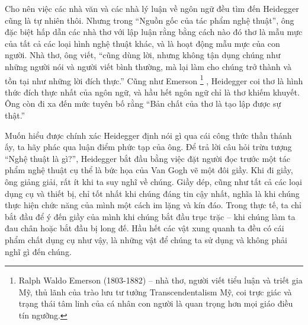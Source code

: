 \documentclass[../main.tex]{subfiles}
\begin{document}
\begin{multicols}{2}
Cho nên việc các nhà văn và các nhà lý luận về ngôn ngữ đều tìm đến Heidegger cũng là tự nhiên thôi. Nhưng trong “Nguồn gốc của tác phẩm nghệ thuật”, ông đặc biệt hấp dẫn các nhà thơ với lập luận rằng bằng cách nào đó thơ là mẫu mực của tất cả các loại hình nghệ thuật khác, và là hoạt động mẫu mực của con người. Nhà thơ, ông viết, “cũng dùng lời, nhưng không tận dụng chúng như những người nói và người viết bình thường, mà lại làm cho chúng trở thành và tồn tại như những lời đích thực.” Cũng như Emerson \footnote{
Ralph Waldo Emerson (1803-1882) – nhà thơ, người viết tiểu luận và triết gia Mỹ, thủ lãnh của trào lưu tư tưởng Transcendentalism Mỹ, coi trực giác và trạng thái tâm linh của cá nhân con người là quan trọng hơn mọi giáo điều tín ngưỡng.} , Heidegger coi thơ là hình thức đích thực nhất của ngôn ngữ, và hầu hết ngôn ngữ chỉ là thơ khiếm khuyết. Ông còn đi xa đến mức tuyên bố rằng “Bản chất của thơ là tạo lập được sự thật.” 

Muốn hiểu được chính xác Heidegger định nói gì qua cái công thức thần thánh ấy, ta hãy phác qua luận điểm phức tạp của ông. Để trả lời câu hỏi trừu tượng “Nghệ thuật là gì?”, Heidegger bắt đầu bằng việc đặt người đọc trước một tác phẩm nghệ thuật cụ thể là bức họa của Van Gogh vẽ một đôi giầy. Khi đi giầy, ông giảng giải, rất ít khi ta suy nghĩ về chúng. Giầy dép, cũng như tất cả các loại dụng cụ và thiết bị, chỉ tốt nhất khi chúng đáng tin cậy nhất, nghĩa là khi chúng thực hiện chức năng của mình một cách im lặng và kín đáo. Trong thực tế, ta chỉ bắt đầu để ý đến giầy của mình khi chúng bắt đầu trục trặc – khi chúng làm ta đau chân hoặc bắt đầu bị long đế. Hầu hết các vật xung quanh ta đều có cái phẩm chất dụng cụ như vậy, là những vật để chúng ta sử dụng và không phải nghĩ gì đến chúng. 


\end{multicols}
\end{document}
